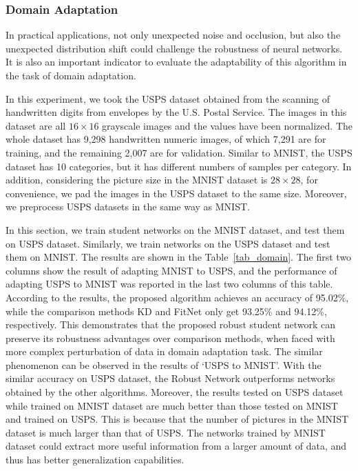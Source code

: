 \documentclass[journal]{IEEEtran}
\newcommand{\Tref}[1]{Table~\ref{#1}}
\begin{document}
\subsubsection{Domain Adaptation}
In practical applications, not only unexpected noise and occlusion, but also the unexpected distribution shift could challenge the robustness of neural networks. It is also an important indicator to evaluate the adaptability of this algorithm in the task of domain adaptation. 

In this experiment, we took the USPS dataset obtained from the scanning of handwritten digits from envelopes by the U.S. Postal Service. The images in this dataset are all $16\times16$ grayscale images and the values have been normalized. The whole dataset has 9,298 handwritten numeric images, of which 7,291 are for training, and the remaining 2,007 are for validation. Similar to MNIST, the USPS dataset has 10 categories, but it has different numbers of samples per category. In addition, considering the picture size in the MNIST dataset is $28\times28$, for convenience, we pad the images in the USPS dataset to the same size. Moreover, we preprocess USPS datasets in the same way as MNIST.

In this section, we train student networks on the MNIST dataset, and test them on USPS dataset. Similarly, we train networks on the USPS dataset and test them on MNIST. The results are shown in the \Tref{tab_domain}. The first two columns show the result of adapting MNIST to USPS, and the performance of adapting USPS to MNIST was reported in the last two columns of this table. According to the results, the proposed algorithm achieves an accuracy of 95.02\%, while the comparison methods KD and FitNet only get 93.25\% and 94.12\%, respectively. This demonstrates that the proposed robust student network can preserve its robustness advantages over comparison methods, when faced with more complex perturbation of data in domain adaptation task. The similar phenomenon can be observed in the results of `USPS to MNIST'. With the similar accuracy on USPS dataset, the Robust Network outperforms networks obtained by the other algorithms. Moreover, the results tested on USPS dataset while trained on MNIST dataset are much better than those tested on MNIST and trained on USPS. This is because that the number of pictures in the MNIST dataset is much larger than that of USPS. The networks trained by MNIST dataset could extract more useful information from a larger amount of data, and thus has better generalization capabilities. 
\end{document}
